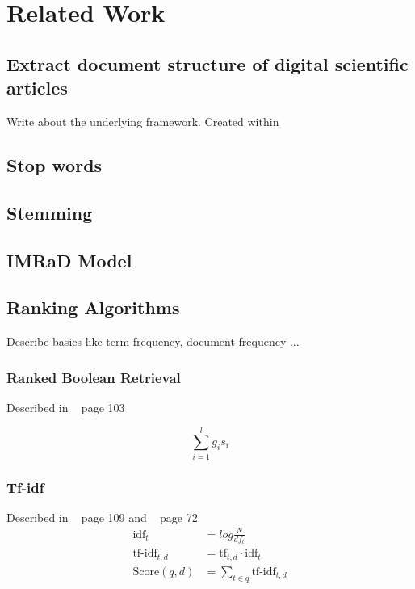 \chapter{Related Work}
\label{cha:related_work}

\section{Extract document structure of digital scientific articles}
\label{sec:extract_document_structure}

Write about the underlying framework. Created within ~\cite{KlampflGJK14}

\section{Stop words}
\label{sec:stop_words}

\section{Stemming}
\label{sec:stemming}

\section{IMRaD Model}
\label{sec:imrad_model}

\section{Ranking Algorithms}
\label{sec:ranking_algorithms}

Describe basics like term frequency, document frequency ...

\subsection{Ranked Boolean Retrieval}
\label{sec:ranked_boolean_retrieval}

Described in ~\cite{manning2008} page 103

\begin{equation}
  \sum_{i = 1}^{l}g_i s_i
\end{equation}

\subsection{Tf-idf}
\label{sec:tfidf}

Described in ~\cite{manning2008} page 109 and ~\cite{ModernInvormationRetrieval1999} page 72
\begin{equation}
  \begin{split}
    \text{idf}_t & = log \frac{N}{df_t} \\
    \text{tf-idf}_{t, d} & = \text{tf}_{t, d} \cdot \text{idf}_t \\
    \text{Score}(q, d) & = \sum_{t \in q}\text{tf-idf}_{t, d}
  \end{split}
\end{equation}


